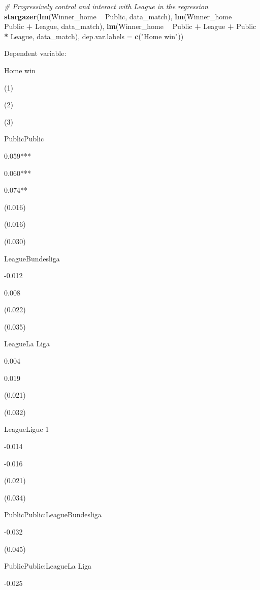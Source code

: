 \documentclass[
]{article}
\newenvironment{Shaded}{\begin{snugshade}}{\end{snugshade}}
\newcommand{\CommentTok}[1]{\textcolor[rgb]{0.56,0.35,0.01}{\textit{#1}}}
\newcommand{\DataTypeTok}[1]{\textcolor[rgb]{0.13,0.29,0.53}{#1}}
\newcommand{\KeywordTok}[1]{\textcolor[rgb]{0.13,0.29,0.53}{\textbf{#1}}}
\newcommand{\NormalTok}[1]{#1}
\newcommand{\OperatorTok}[1]{\textcolor[rgb]{0.81,0.36,0.00}{\textbf{#1}}}
\newcommand{\StringTok}[1]{\textcolor[rgb]{0.31,0.60,0.02}{#1}}
\begin{document}
\begin{Shaded}
\begin{Highlighting}[]
\CommentTok{# Progressively control and interact with League in the regression}
\KeywordTok{stargazer}\NormalTok{(}\KeywordTok{lm}\NormalTok{(Winner_home }\OperatorTok{~}\StringTok{ }\NormalTok{Public, data_match),}
          \KeywordTok{lm}\NormalTok{(Winner_home }\OperatorTok{~}\StringTok{ }\NormalTok{Public }\OperatorTok{+}\StringTok{ }\NormalTok{League, data_match),}
          \KeywordTok{lm}\NormalTok{(Winner_home }\OperatorTok{~}\StringTok{ }\NormalTok{Public }\OperatorTok{+}\StringTok{ }\NormalTok{League }\OperatorTok{+}\StringTok{ }\NormalTok{Public }\OperatorTok{*}\StringTok{ }\NormalTok{League, data_match),}
          \DataTypeTok{dep.var.labels =} \KeywordTok{c}\NormalTok{(}\StringTok{"Home win"}\NormalTok{))}
\end{Highlighting}
\end{Shaded}

Dependent variable:

Home win

(1)

(2)

(3)

PublicPublic

0.059***

0.060***

0.074**

(0.016)

(0.016)

(0.030)

LeagueBundesliga

-0.012

0.008

(0.022)

(0.035)

LeagueLa Liga

0.004

0.019

(0.021)

(0.032)

LeagueLigue 1

-0.014

-0.016

(0.021)

(0.034)

PublicPublic:LeagueBundesliga

-0.032

(0.045)

PublicPublic:LeagueLa Liga

-0.025
\end{document}
